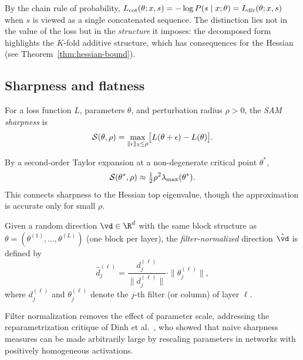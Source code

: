 \begin{remark}\label{rem:chain-rule}
  By the chain rule of probability, $L_{\mathrm{cot}}(\theta; x, s) = -\log P(s \mid x;
  \theta) = L_{\mathrm{dir}}(\theta; x, s)$ when $s$ is viewed as a single concatenated
  sequence. The distinction lies not in the value of the loss but in the
  \emph{structure} it imposes: the decomposed form highlights the $K$-fold
  additive structure, which has consequences for the Hessian (see
  Theorem~\ref{thm:hessian-bound}).
\end{remark}

\subsection{Sharpness and flatness}\label{subsec:sharpness}

\begin{definition}\label{def:sam}
  For a loss function $L$, parameters $\theta$, and perturbation radius
  $\rho > 0$, the \emph{SAM sharpness} is
  \[
    \mathcal{S}(\theta, \rho) = \max_{\|\epsilon\|_2 \le \rho}
    \bigl[L(\theta + \epsilon) - L(\theta)\bigr].
  \]
\end{definition}

By a second-order Taylor expansion at a non-degenerate critical point $\theta^*$,
\begin{equation}\label{eq:sharpness-hessian}
  \mathcal{S}(\theta^*, \rho) \approx \tfrac{1}{2}\rho^2 \lambda_{\max}(\theta^*).
\end{equation}
This connects sharpness to the Hessian top eigenvalue, though the approximation
is accurate only for small $\rho$.

\begin{definition}\label{def:filter-norm}
  Given a random direction $\vd \in \R^d$ with the same block structure as
  $\theta = (\theta^{(1)}, \ldots, \theta^{(L)})$ (one block per layer), the
  \emph{filter-normalized} direction $\hat{\vd}$ is defined by
  \[
    \hat{d}^{(\ell)}_j = \frac{d^{(\ell)}_j}{\|d^{(\ell)}_j\|}
    \cdot \|\theta^{(\ell)}_j\|,
  \]
  where $d^{(\ell)}_j$ and $\theta^{(\ell)}_j$ denote the $j$-th filter
  (or column) of layer $\ell$.
\end{definition}

Filter normalization removes the effect of parameter scale, addressing the
reparametrization critique of Dinh et al.~\cite{dinh2017sharp}, who showed that
naive sharpness measures can be made arbitrarily large by rescaling parameters
in networks with positively homogeneous activations.

